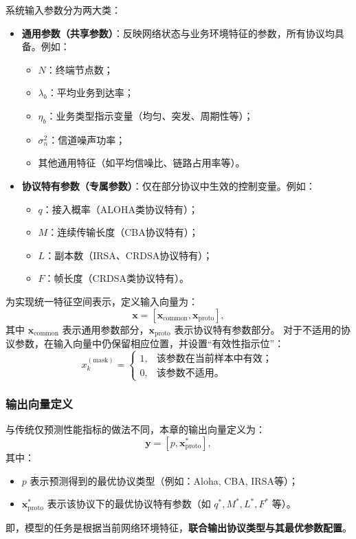 系统输入参数分为两大类：
\begin{itemize}
	\item \textbf{通用参数（共享参数）}：反映网络状态与业务环境特征的参数，所有协议均具备。例如：
	\begin{itemize}
		\item $N$：终端节点数；
		\item $\lambda_b$：平均业务到达率；
		\item $\eta_b$：业务类型指示变量（均匀、突发、周期性等）；
		\item $\sigma_n^2$：信道噪声功率；
		\item 其他通用特征（如平均信噪比、链路占用率等）。
	\end{itemize}
	
	\item \textbf{协议特有参数（专属参数）}：仅在部分协议中生效的控制变量。例如：
	\begin{itemize}
		\item $q$：接入概率（ALOHA类协议特有）；
		\item $M$：连续传输长度（CBA协议特有）；
		\item $L$：副本数（IRSA、CRDSA协议特有）；
		\item $F$：帧长度（CRDSA类协议特有）。
	\end{itemize}
\end{itemize}

为实现统一特征空间表示，定义输入向量为：
\[
\mathbf{x} = [\mathbf{x}_\text{common}, \mathbf{x}_\text{proto}],
\]
其中 $\mathbf{x}_\text{common}$ 表示通用参数部分，$\mathbf{x}_\text{proto}$ 表示协议特有参数部分。
对于不适用的协议参数，在输入向量中仍保留相应位置，并设置“有效性指示位”：
\[
x^{(\text{mask})}_k =
\begin{cases}
	1, & \text{该参数在当前样本中有效；} \\
	0, & \text{该参数不适用。}
\end{cases}
\]

\subsubsection{输出向量定义}
与传统仅预测性能指标的做法不同，本章的输出向量定义为：
\[
\mathbf{y} = [p, \mathbf{x}^*_\text{proto}],
\]
其中：
\begin{itemize}
	\item $p$ 表示预测得到的最优协议类型（例如：Aloha, CBA, IRSA等）；
	\item $\mathbf{x}^*_\text{proto}$ 表示该协议下的最优协议特有参数（如 $q^*, M^*, L^*, F^*$ 等）。
\end{itemize}
即，模型的任务是根据当前网络环境特征，\textbf{联合输出协议类型与其最优参数配置}。

